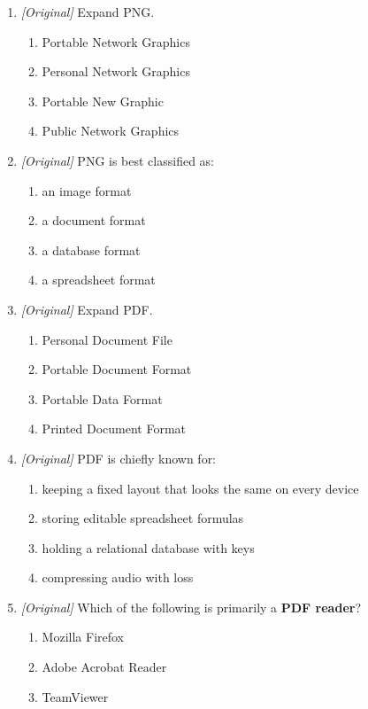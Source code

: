 \begin{enumerate}[label=\textbf{Q\arabic*.}, leftmargin=*]
\item \textit{[Original]} Expand PNG.
  \begin{enumerate}[label=\Alph*.]
    \item Portable Network Graphics
    \item Personal Network Graphics
    \item Portable New Graphic
    \item Public Network Graphics
  \end{enumerate}
\item \textit{[Original]} PNG is best classified as:
  \begin{enumerate}[label=\Alph*.]
    \item an image format
    \item a document format
    \item a database format
    \item a spreadsheet format
  \end{enumerate}
\item \textit{[Original]} Expand PDF.
  \begin{enumerate}[label=\Alph*.]
    \item Personal Document File
    \item Portable Document Format
    \item Portable Data Format
    \item Printed Document Format
  \end{enumerate}
\item \textit{[Original]} PDF is chiefly known for:
  \begin{enumerate}[label=\Alph*.]
    \item keeping a fixed layout that looks the same on every device
    \item storing editable spreadsheet formulas
    \item holding a relational database with keys
    \item compressing audio with loss
  \end{enumerate}
\item \textit{[Original]} Which of the following is primarily a \textbf{PDF
  reader}?
  \begin{enumerate}[label=\Alph*.]
    \item Mozilla Firefox
    \item Adobe Acrobat Reader
    \item TeamViewer

\end{enumerate}
\end{enumerate}
